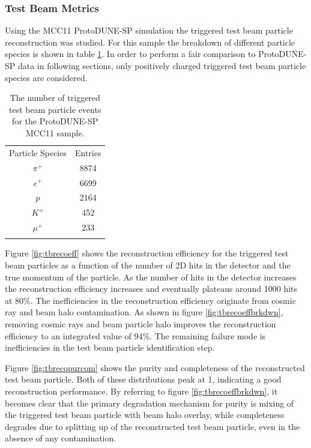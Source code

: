 \subsubsection{Test Beam Metrics}

Using the MCC11 ProtoDUNE-SP simulation the triggered test beam particle reconstruction was studied. For this sample the breakdown of different particle species is shown in table \ref{tab:mcc11species}.  In order to perform a fair comparison to ProtoDUNE-SP data in following sections, only positively charged triggered test beam particle species are considered.

\begin{table}
\centering
\caption{The number of triggered test beam particle events for the ProtoDUNE-SP MCC11 sample.}
\label{tab:mcc11species} 
\begin{tabular}{cc}
\hline\noalign{\smallskip}
Particle Species & Entries  \\
\noalign{\smallskip}\hline\noalign{\smallskip}
$\pi^{+}$ & 8874 \\
$e^{+}$ & 6699 \\
$p$ & 2164 \\
$K^{+}$ & 452 \\
$\mu^{+}$ & 233 \\
\noalign{\smallskip}\hline
\end{tabular}
\end{table}

Figure \ref{fig:tbrecoeff} shows the reconstruction efficiency for the triggered test beam particles as a function of the number of 2D hits in the detector and the true momentum of the particle.  As the number of hits in the detector increases the reconstruction efficiency increases and eventually plateaus around 1000 hits at 80\%.  The inefficiencies in the reconstruction efficiency originate from cosmic ray and beam halo contamination.  As shown in figure \ref{fig:tbrecoeffbrkdwn}, removing cosmic rays and beam particle halo improves the reconstruction efficiency to an integrated value of 94\%.  The remaining failure mode is inefficiencies in the test beam particle identification step.

Figure \ref{fig:tbrecopurcom} shows the purity and completeness of the reconstructed test beam particle.  Both of these distributions peak at 1, indicating a good reconstruction performance. By referring to figure \ref{fig:tbrecoeffbrkdwn}, it becomes clear that the primary degradation mechanism for purity is mixing of the triggered test beam particle with beam halo overlay, while completeness degrades due to splitting up of the reconstructed test beam particle, even in the absence of any contamination.  

